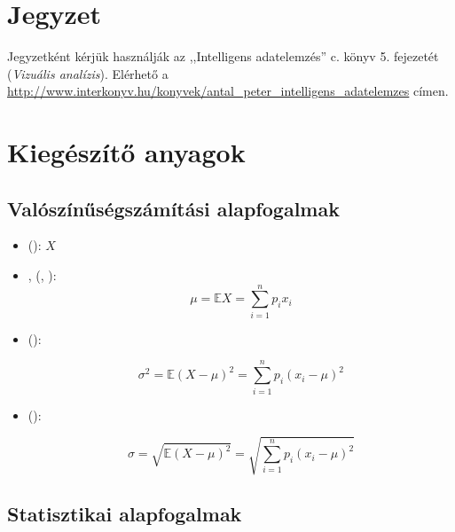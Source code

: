 
\section{Jegyzet}

Jegyzetként kérjük használják az ,,Intelligens adatelemzés'' c. könyv 5. fejezetét (\emph{Vizuális analízis}). Elérhető a \url{http://www.interkonyv.hu/konyvek/antal_peter_intelligens_adatelemzes} címen.

\section{Kiegészítő anyagok\kieg}

\subsection{Valószínűségszámítási alapfogalmak}

\begin{definicio}
	\begin{itemize}
		\item {} (): $X$
		\item {},  (, ):
		$$\mu = \mathbb{E}X = \sum_{i=1}^{n} p_i x_i$$
		
		\item {} ():
		
		$$\sigma^2 = \mathbb{E}\left(X-\mu\right)^2 = \sum_{i=1}^{n} p_i (x_i - \mu)^2$$
		
		\item {} ():
		
		$$\sigma = \sqrt{\mathbb{E}\left(X-\mu\right)^2} = \sqrt{\sum_{i=1}^{n} p_i (x_i - \mu)^2}$$
	\end{itemize}
\end{definicio}

\subsection{Statisztikai alapfogalmak}

